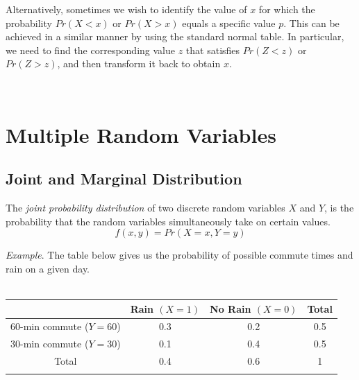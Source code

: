 \documentclass{./../../Latex/handout}
\begin{document}
Alternatively, sometimes we wish to identify the value of $x$ for which the probability $Pr(X < x)$ or $Pr(X > x)$ equals a specific value $p$. This can be achieved in a similar manner by using the standard normal table. In particular, we need to find the corresponding value $z$ that satisfies $Pr(Z < z)$ or $Pr(Z > z)$, and then transform it back to obtain $x$. 

 \\ 


\section{Multiple Random Variables}

\subsection{Joint and Marginal Distribution}

The \textit{joint probability distribution} of two discrete random variables $X$ and $Y$, is the probability that the random variables simultaneously take on certain values.
$$ f(x,y) = Pr(X=x, Y=y)  $$
\vspace{0.25em}

\textit{Example}. The table below gives us the probability of possible commute times and rain on a given day. \\~\\
\begin{tabularx}{0.95\textwidth}{cccc}
\toprule
	& Rain $(X=1)$ & No Rain $(X=0)$ & Total \\
	\midrule
60-min commute ($Y=60$) & 0.3  & 0.2 & 0.5 \\ 
30-min commute ($Y=30$) & 0.1 & 0.4 & 0.5 \\
\midrule
 Total & 0.4 & 0.6 & 1 \\
 \bottomrule \\
\end{tabularx}
\end{document}
